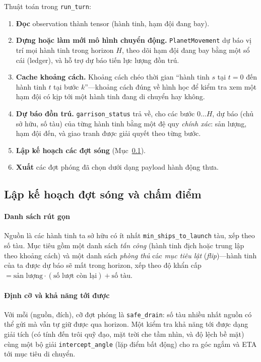 \documentclass[conference]{IEEEtran}
\begin{document}
Thuật toán trong \texttt{run\_turn}:
\begin{enumerate}
\item \textbf{Đọc} observation thành tensor (hành tinh, hạm đội đang bay).
\item \textbf{Dựng hoặc làm mới mô hình chuyển động.} \texttt{PlanetMovement} dự báo vị trí mọi hành tinh trong horizon $H$, theo dõi hạm đội đang bay bằng một sổ cái (ledger), và hỗ trợ dự báo tiến lực lượng đồn trú.
\item \textbf{Cache khoảng cách.} Khoảng cách chéo thời gian ``hành tinh $s$ tại $t{=}0$ đến hành tinh $t$ tại bước $k$''---khoảng cách đúng về hình học để kiểm tra xem một hạm đội có kịp tới một hành tinh đang di chuyển hay không.
\item \textbf{Dự báo đồn trú.} \texttt{garrison\_status} trả về, cho các bước $0\ldots H$, dự báo (chủ sở hữu, số tàu) của từng hành tinh bằng một đệ quy \emph{chính xác}: sản lượng, hạm đội đến, và giao tranh được giải quyết theo từng bước.
\item \textbf{Lập kế hoạch các đợt sóng} (Mục~\ref{sec:waves}).
\item \textbf{Xuất} các đợt phóng đã chọn dưới dạng payload hành động thưa.
\end{enumerate}

\subsection{Lập kế hoạch đợt sóng và chấm điểm}
\label{sec:waves}

\paragraph{Danh sách rút gọn} Nguồn là các hành tinh ta sở hữu có ít nhất \texttt{min\_ships\_to\_launch} tàu, xếp theo số tàu. Mục tiêu gồm một danh sách \emph{tấn công} (hành tinh địch hoặc trung lập theo khoảng cách) và một danh sách \emph{phòng thủ} các \textit{mục tiêu lật} (\textit{flip})---hành tinh của ta được dự báo sẽ mất trong horizon, xếp theo độ khẩn cấp $=\text{sản lượng}\cdot(\text{số lượt còn lại}) + \text{số tàu}$.

\paragraph{Định cỡ và khả năng tới được} Với mỗi (nguồn, đích), cỡ đợt phóng là \texttt{safe\_drain}: số tàu nhiều nhất nguồn có thể gửi mà vẫn tự giữ được qua horizon. Một kiểm tra khả năng tới được dạng giải tích (có tính đến trôi quỹ đạo, mặt trời che tầm nhìn, và độ lệch bề mặt) cùng một bộ giải \texttt{intercept\_angle} (lặp điểm bất động) cho ra góc ngắm và ETA tới mục tiêu di chuyển.
\end{document}
